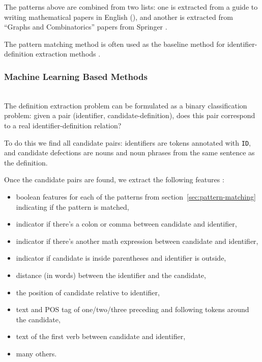The patterns above are combined from two lists: one is extracted from a
guide to writing mathematical papers in English (\cite{trzeciak1995writing}),
and another is extracted from ``Graphs and Combinatorics'' papers from Springer
\cite{kristianto2012extracting}.

The pattern matching method is often used as the baseline method
for identifier-definition extraction methods \cite{kristianto2012extracting}
\cite{kristianto2014extracting} \cite{pagael2014mlp}.


\subsubsection{Machine Learning Based Methods}

\ \\

The definition extraction problem can be formulated as a binary classification
problem: given a pair (identifier, candidate-definition), does this pair
correspond to a real identifier-definition relation?

To do this we find all candidate pairs: identifiers are tokens
annotated with \texttt{ID}, and candidate defections are nouns and
noun phrases from the same sentence as the definition.

Once the candidate pairs are found, we extract the following features
\cite{yokoi2011contextual} \cite{kristianto2014extracting}:


\begin{itemize}
\itemsep1pt\parskip0pt
  \item boolean features for each of the patterns from
    section~\ref{sec:pattern-matching} indicating if the pattern is matched,
  \item indicator if there's a colon or comma between candidate and identifier,
  \item indicator if there's another math expression between candidate and identifier,
  \item indicator if candidate is inside parentheses and identifier is outside,
  \item distance (in words) between the identifier and the candidate,
  \item the position of candidate relative to identifier,
  \item text and POS tag of one/two/three preceding and following tokens around the candidate,
  \item text of the first verb between candidate and identifier,
  \item many others.
\end{itemize}


